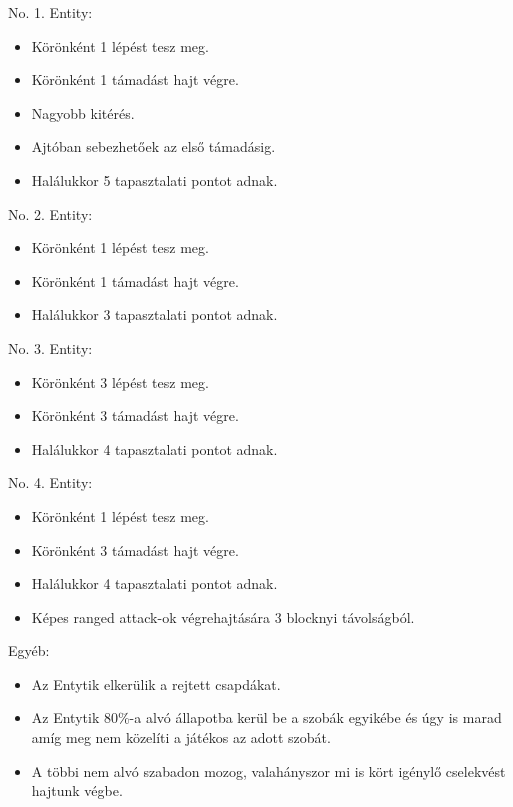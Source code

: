 

\noindent No. 1. Entity:
\begin{itemize}
    \item Körönként 1 lépést tesz meg.
    \item Körönként 1 támadást hajt végre.
    \item Nagyobb kitérés.
    \item Ajtóban sebezhetőek az első támadásig.
    \item Halálukkor 5 tapasztalati pontot adnak.
\end{itemize}

\noindent No. 2. Entity:
\begin{itemize}
    \item Körönként 1 lépést tesz meg.
    \item Körönként 1 támadást hajt végre.
    \item Halálukkor 3 tapasztalati pontot adnak.
\end{itemize}

\noindent No. 3. Entity:
\begin{itemize}
    \item Körönként 3 lépést tesz meg.
    \item Körönként 3 támadást hajt végre.
    \item Halálukkor 4 tapasztalati pontot adnak.
\end{itemize}

\noindent No. 4. Entity:
\begin{itemize}
    \item Körönként 1 lépést tesz meg.
    \item Körönként 3 támadást hajt végre.
    \item Halálukkor 4 tapasztalati pontot adnak.
    \item Képes ranged attack-ok végrehajtására 3 blocknyi távolságból.
\end{itemize}

\noindent Egyéb:
\begin{itemize}
    \item Az Entytik elkerülik a rejtett csapdákat.
    \item Az Entytik 80\%-a alvó állapotba kerül be a szobák egyikébe és úgy is marad amíg meg nem közelíti a játékos az adott szobát.
    \item A többi nem alvó szabadon mozog, valahányszor mi is kört igénylő cselekvést hajtunk végbe.
\end{itemize}

